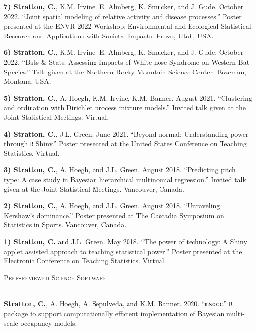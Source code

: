 \documentclass[a4paper]{article}
\newcommand{\lineunder} {
	\vspace*{-8pt} \\
	\hspace*{-18pt} \hrulefill \\
}
\newcommand{\header} [1] {
	{\hspace*{-18pt}\vspace*{6pt} \textsc{#1}}
	\vspace*{-6pt} \lineunder
}
\begin{document}
\textbf{7) Stratton, C.}, K.M. Irvine, E. Almberg, K. Smucker, and J.
Gude. October 2022. ``Joint spatial modeling of relative activity and
disease processes.'' Poster presented at the ENVR 2022 Workshop:
Environmental and Ecological Statistical Research and Applications with
Societal Impacts. Provo, Utah, USA. \vspace*{2mm}

\textbf{6) Stratton, C.}, K.M. Irvine, E. Almberg, K. Smucker, and J.
Gude. October 2022. ``Bats \& Stats: Assessing Impacts of White-nose
Syndrome on Western Bat Species.'' Talk given at the Northern Rocky
Mountain Science Center. Bozeman, Montana, USA. \vspace*{2mm}

\textbf{5) Stratton, C.}, A. Hoegh, K.M. Irvine, K.M. Banner. August
2021. ``Clustering and ordination with Dirichlet process mixture
models.'' Invited talk given at the Joint Statistical Meetings. Virtual.
\vspace*{2mm}

\textbf{4) Stratton, C.}, J.L. Green. June 2021. ``Beyond normal:
Understanding power through \texttt{R} Shiny.'' Poster presented at the
United States Conference on Teaching Statistics. Virtual. \vspace*{2mm}

\textbf{3) Stratton, C.}, A. Hoegh, and J.L. Green. August 2018.
``Predicting pitch type: A case study in Bayesian hierarchical
multinomial regression.'' Invited talk given at the Joint Statistical
Meetings. Vancouver, Canada. \vspace*{2mm}

\textbf{2) Stratton, C.}, A. Hoegh, and J.L. Green. August 2018.
``Unraveling Kershaw's dominance.'' Poster presented at The Cascadia
Symposium on Statistics in Sports. Vancouver, Canada. \vspace*{2mm}

\textbf{1) Stratton, C.} and J.L. Green. May 2018. ``The power of
technology: A Shiny applet assisted approach to teaching statistical
power.'' Poster presented at the Electronic Conference on Teaching
Statistics. Virtual. \vspace*{2mm}

\header{Peer-reviewed Science Software}
\vspace*{2mm}

\textbf{Stratton, C.}, A. Hoegh, A. Sepulveda, and K.M. Banner. 2020.
``\texttt{msocc}.'' \texttt{R} package to support computationally
efficient implementation of Bayesian multi-scale occupancy models.
\vspace*{2mm}
\end{document}
